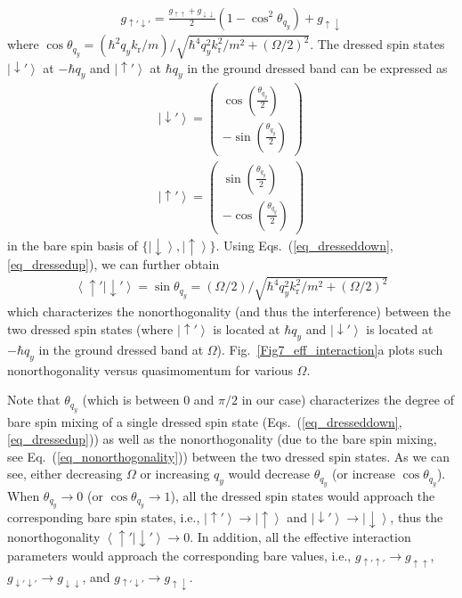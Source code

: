 \documentclass[showpacs,preprintnumbers,amsmath,amssymb, superscriptaddress, aps, reprint]{revtex4-1}
\def\k_r{k_{\text{r}}}
\begin{document}
{{{\begin{align}
\end{align}
\begin{align}
\label{eq_eff_gud}
g_{\uparrow'\downarrow'}=\frac{g_{\uparrow\uparrow}+g_{\downarrow\downarrow}}{2}(1-\cos^2\theta_{q_y})+g_{\uparrow\downarrow}
\end{align}
where $\cos \theta_{q_y}=(\hbar^2q_y \k_r/m)/\sqrt{\hbar^4q_y^2\k_r^2/m^2+(\Omega/2)^2}$. The dressed spin states $\left|\downarrow'\right\rangle$ at $-\hbar q_y$ and $\left|\uparrow'\right\rangle$ at $\hbar q_y$ in the ground dressed band can be expressed as
\begin{align}
\left|\downarrow'\right\rangle =
\begin{pmatrix}
\cos (\frac{\theta_{q_y}}{2}) \\ 
-\sin (\frac{\theta_{q_y}}{2})
\label{eq_dresseddown}
\end{pmatrix}
\\
\left|\uparrow'\right\rangle =
\begin{pmatrix}
\sin (\frac{\theta_{q_y}}{2}) \\ 
-\cos (\frac{\theta_{q_y}}{2})
\label{eq_dressedup}
\end{pmatrix}
\end{align}
in the bare spin basis of $\{\left|\downarrow\right\rangle, \left|\uparrow\right\rangle\}$. Using Eqs.~(\ref{eq_dresseddown}, \ref{eq_dressedup}), we can further obtain
\begin{align}
\left\langle\uparrow'|\downarrow'\right\rangle = \sin \theta_{q_y}=(\Omega/2)/\sqrt{\hbar^4q_y^2\k_r^2/m^2+(\Omega/2)^2}
\label{eq_nonorthogonality}
\end{align}
which characterizes the nonorthogonality (and thus the interference) between the two dressed spin states (where $\left|\uparrow'\right\rangle$ is located at $\hbar q_y$ and $\left|\downarrow'\right\rangle$ is located at $-\hbar q_y$ in the ground dressed band at $\Omega$). {Fig.~{\ref{Fig7_eff_interaction}}a} plots such nonorthogonality versus quasimomentum for various $\Omega$.



Note that $\theta_{q_y}$ (which is between $0$ and $\pi/2$ in our case) characterizes the degree of bare spin mixing of a single dressed spin state (Eqs.~(\ref{eq_dresseddown}, \ref{eq_dressedup})) as well as the nonorthogonality (due to the bare spin mixing, see Eq.~(\ref{eq_nonorthogonality})) between the two dressed spin states. As we can see, either decreasing $\Omega$ or increasing $q_y$ would decrease $\theta_{q_y}$ (or increase $\cos \theta_{q_y}$). When $\theta_{q_y}\rightarrow 0$ (or $\cos \theta_{q_y}\rightarrow 1$), all the dressed spin states would approach the corresponding bare spin states, i.e., $\left|\uparrow'\right\rangle \rightarrow \left|\uparrow\right\rangle$ and $\left|\downarrow'\right\rangle \rightarrow \left|\downarrow\right\rangle$, thus the nonorthogonality $\left\langle\uparrow'|\downarrow'\right\rangle \rightarrow 0$. In addition, all the effective interaction parameters would approach the corresponding bare values, i.e., $g_{\uparrow'\uparrow'}\rightarrow g_{\uparrow\uparrow}$, $g_{\downarrow'\downarrow'}\rightarrow g_{\downarrow\downarrow}$, and $g_{\uparrow'\downarrow'}\rightarrow g_{\uparrow\downarrow}$. 


}}}
\end{document}
